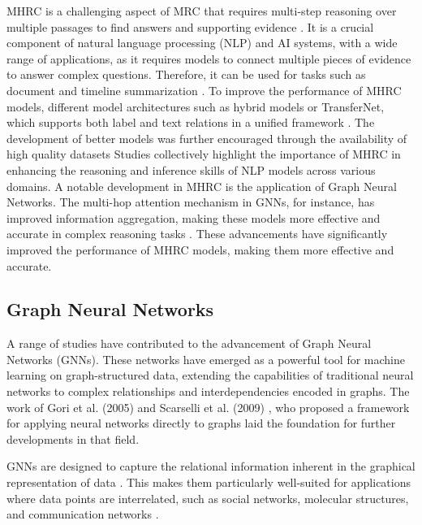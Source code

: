 \documentclass[sigplan,screen,nonacm]{acmart}
\begin{document}
MHRC is a challenging aspect of MRC that requires multi-step reasoning over multiple passages to find answers 
and supporting evidence \cite{RN165}. It is a crucial component of natural language processing (NLP) and AI systems, with a wide range of applications, 
as it requires models to connect multiple pieces of evidence to answer complex questions. Therefore, it can be used for tasks such as document 
and timeline summarization \cite{RN202, RN201}. To improve the performance of MHRC models, different model architectures such 
as hybrid models or TransferNet, which supports both label and text relations in a unified framework \cite{RN164, RN133}. 
The development of better models was further encouraged through the availability of high quality datasets \cite{RN116, RN115}
Studies collectively highlight the importance of MHRC in enhancing the reasoning and inference skills of NLP models across various domains. 
A notable development in MHRC is the application of Graph Neural Networks. The multi-hop attention mechanism in GNNs, for instance, 
has improved information aggregation, making these models more effective and accurate in complex reasoning tasks \cite{RN109}. These advancements 
have significantly improved the performance of MHRC models, making them more effective and accurate.

\subsection{Graph Neural Networks}

A range of studies have contributed to the advancement of Graph Neural Networks (GNNs). These networks have emerged 
as a powerful tool for machine learning on graph-structured data, extending the capabilities of traditional neural networks to complex relationships 
and interdependencies encoded in graphs. The work of Gori et al. (2005) \cite{RN203} and Scarselli et al. (2009) \cite{RN204}, who proposed a framework for 
applying neural networks directly to graphs laid the foundation for further developments in that field.

GNNs are designed to capture the relational information inherent in the graphical representation of data \cite{RN205}. This makes them particularly 
well-suited for applications where data points are interrelated, such as social networks, molecular structures, and communication networks \cite{RN206}.
\end{document}
